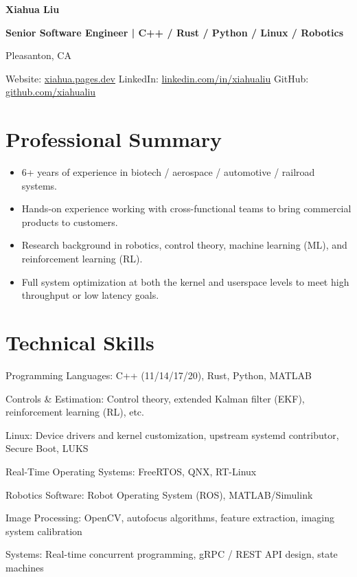 \documentclass[11pt,a4paper]{article}
\newcommand{\resumetitle}{Senior Software Engineer | C++ / Rust / Python / Linux / Robotics}
\newcommand{\resumeskill}[2]{{\resumesemibold #1:} #2\par}
\begin{document}
{\LARGE\bfseries Xiahua Liu}\par
{\normalsize\bfseries \resumetitle}\par
Pleasanton, CA\par
Website: \href{https://xiahua.pages.dev}{xiahua.pages.dev}\quad
LinkedIn: \href{https://www.linkedin.com/in/xiahualiu}{linkedin.com/in/xiahualiu}\quad
GitHub: \href{https://github.com/xiahualiu}{github.com/xiahualiu}\par

\section*{Professional Summary}
\begin{itemize}[before=\normalfont,itemsep=1pt,topsep=2pt]
  \item 6+ years of experience in biotech / aerospace / automotive / railroad systems.
  \item Hands-on experience working with cross-functional teams to bring commercial products to customers.
  \item Research background in robotics, control theory, machine learning (ML), and reinforcement learning (RL).
  \item Full system optimization at both the kernel and userspace levels to meet high throughput or low latency goals.
\end{itemize}

\section*{Technical Skills}
\resumeskill{Programming Languages}{C++ (11/14/17/20), Rust, Python, MATLAB}

\resumeskill{Controls \& Estimation}{Control theory, extended Kalman filter (EKF), reinforcement learning (RL), etc.}

\resumeskill{Linux}{Device drivers and kernel customization, upstream systemd contributor, Secure Boot, LUKS}

\resumeskill{Real-Time Operating Systems}{FreeRTOS, QNX, RT-Linux}

\resumeskill{Robotics Software}{Robot Operating System (ROS), MATLAB/Simulink}

\resumeskill{Image Processing}{OpenCV, autofocus algorithms, feature extraction, imaging system calibration}

\resumeskill{Systems}{Real-time concurrent programming, gRPC / REST API design, state machines}
\end{document}

